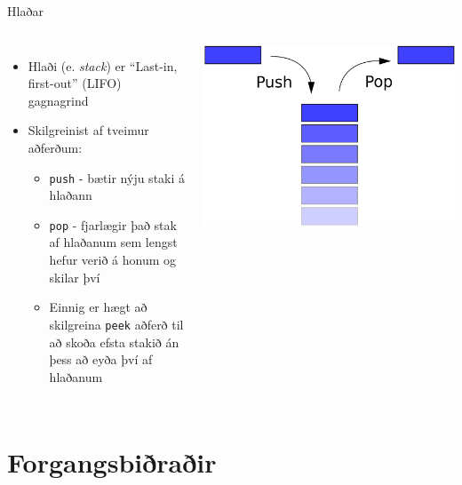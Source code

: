 \documentclass{beamer}
\begin{document}
\begin{frame}{Hlaðar}
\begin{columns}[c]
\begin{itemize}
 \item Hlaði (e. \emph{stack}) er ``Last-in, first-out'' (LIFO) gagnagrind
 \item Skilgreinist af tveimur aðferðum:
 \begin{itemize}
  \item \texttt{push} - bætir nýju staki á hlaðann
  \item \texttt{pop} - fjarlægir það stak af hlaðanum sem lengst hefur verið á honum og skilar því
  \item Einnig er hægt að skilgreina \texttt{peek} aðferð til að skoða efsta stakið án þess að eyða því af hlaðanum
 \end{itemize}
\end{itemize}
\includegraphics[width=\linewidth]{Pics/stack}
\end{columns}
\end{frame}

\section{Forgangsbiðraðir}
\end{document}

